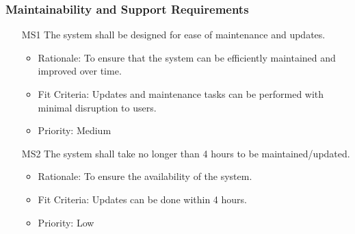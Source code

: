 \documentclass[12pt]{article}
\begin{document}
\subsubsection{Maintainability and Support Requirements}
\begin{itemize}
    \item[MS1] The system shall be designed for ease of maintenance and updates. \label{MS1}
    \begin{itemize}
        \item Rationale: To ensure that the system can be efficiently maintained and improved over time.
        \item Fit Criteria: Updates and maintenance tasks can be performed with minimal disruption to users.
        \item Priority: Medium
    \end{itemize}
\end{itemize}
\begin{itemize}
    \item[MS2] The system shall take no longer than 4 hours to be maintained/updated. \label{MS2}
    \begin{itemize}
        \item Rationale: To ensure the availability of the system.
        \item Fit Criteria: Updates can be done within 4 hours.
        \item Priority: Low
    \end{itemize}
\end{itemize}
\end{document}
